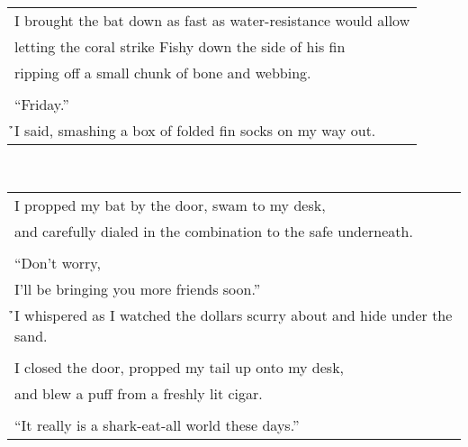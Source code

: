 \documentclass{article}
\begin{document}
\begin{center}
\begin{tabular}{l}
I brought the bat down as fast as water-resistance would allow \\
letting the coral strike Fishy down the side of his fin \\
ripping off a small chunk of bone and webbing. \\
\\
``Friday.'' \\
\h\h{}I said, smashing a box of folded fin socks on my way out. \\
\end{tabular}\\
\begin{tabular}{l}
I propped my bat by the door, swam to my desk, \\
and carefully dialed in the combination to the safe underneath. \\
\\
``Don't worry, \\
I'll be bringing you more friends soon.'' \\
\h\h{}I whispered as I watched the dollars scurry about and hide under the sand. \\
\\
I closed the door, propped my tail up onto my desk, \\
and blew a puff from a freshly lit cigar. \\
\\
``It really is a shark-eat-all world these days.'' \\
\end{tabular}
\end{center}
\end{document}
